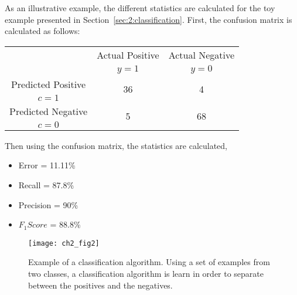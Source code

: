   As an illustrative example, the different statistics are calculated for the toy example presented 
  in Section~\ref{sec:2:classification}. First, the confusion matrix is calculated as 
  follows:
  \begin{center}
    \footnotesize
  \begin{tabular}{c|c|c}
    \multicolumn{1}{c|}{}  & Actual Positive& Actual Negative \\
    \multicolumn{1}{c|}{} & $y=1$& $y=0$ \\
    \hline
    Predicted Positive    & \multirow{ 2}{*}{36} & \multirow{ 
    2}{*}{4} \\
    $c=1$ & &\\
    \hline
    Predicted Negative    & \multirow{ 2}{*}{5} & \multirow{ 
    2}{*}{68} \\
    $c=0$ & &\\
  \end{tabular}
  \end{center}
  Then using the confusion matrix, the statistics are calculated,
 	\begin{itemize}
  	\item Error = 11.11\%
		\item Recall = 87.8\%
		\item Precision = 90\%
		\item $F_1Score$ = 88.8\%
	\end{itemize}
	
\begin{figure}[t!]
	\centering
	\texttt{[image: ch2\_fig2]}
	\caption{Example of a classification algorithm. Using a set of examples from two classes, a 
	classification algorithm is learn in order to separate between the positives and the negatives. }
	\label{fig:2:3}
\end{figure}

